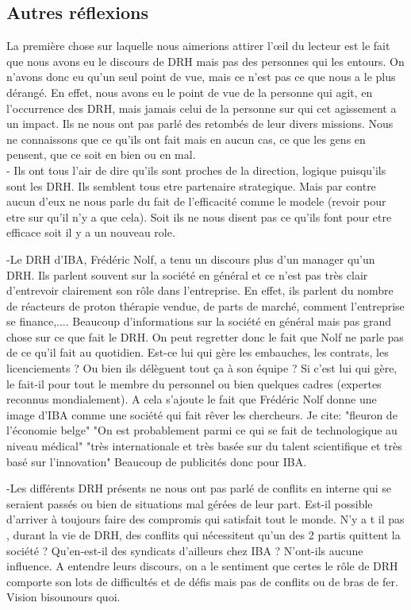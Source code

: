 \subsection{Autres réflexions}

La première chose sur laquelle nous aimerions attirer l'œil du lecteur est le fait que nous avons eu le discours de DRH mais pas des personnes qui les entours. On n'avons donc eu qu'un seul point de vue, mais ce n'est pas ce que nous a le plus dérangé. En effet, nous avons eu le point de vue de la personne qui agit, en l'occurrence des DRH, mais jamais celui de la personne sur qui cet agissement a un impact. Ils ne nous ont pas parlé des retombés de leur divers missions. Nous ne connaissons que ce qu'ils ont fait mais en aucun cas, ce que les gens en pensent, que ce soit en bien ou en mal. \\ 



- Ils ont tous l'air de dire qu'ils sont proches de la direction, logique puisqu'ils sont les DRH. Ils semblent tous etre partenaire strategique. Mais par contre aucun d'eux ne nous parle du fait de l'efficacité comme le modele (revoir pour etre sur qu'il n'y a que cela). Soit ils ne nous disent pas ce qu'ils font pour etre efficace soit il y a un nouveau role. 


-Le DRH d'IBA, Frédéric Nolf, a tenu un discours plus d'un manager qu'un DRH. Ils parlent souvent sur la société en général et ce n'est pas très clair d'entrevoir clairement son rôle dans l'entreprise. En effet, ils parlent du nombre de réacteurs de proton thérapie vendue, de parts de marché, comment l'entreprise se finance,.... Beaucoup d'informations sur la société en général mais pas grand chose sur ce que fait le DRH. On peut regretter donc le fait que Nolf ne parle pas de ce qu'il fait au quotidien. Est-ce lui qui gère les embauches, les contrats, les licenciements ? Ou bien ils délèguent tout ça à son équipe ? Si c'est lui qui gère, le fait-il pour tout le membre du personnel ou bien quelques cadres (expertes reconnus mondialement). 
 A cela s'ajoute le fait que Frédéric Nolf donne une image d'IBA comme une société qui fait rêver les chercheurs.
 Je cite:
 "fleuron de l'économie belge"
 "On est probablement parmi ce qui se fait de technologique au niveau médical"
 "très internationale  et très basée sur du talent scientifique et très basé sur l'innovation"
 Beaucoup de publicités donc pour IBA.
 
 
 
-Les différents DRH présents ne nous ont pas parlé de conflits en interne qui se seraient passés ou bien de situations mal gérées de leur part. Est-il possible d'arriver à toujours faire des compromis qui satisfait tout le monde. N'y a t il pas , durant la vie de DRH, des conflits qui nécessitent qu'un des 2 partis quittent la société ? Qu'en-est-il des syndicats d'ailleurs chez IBA ? N'ont-ils aucune influence. A entendre leurs discours, on a le sentiment que certes le rôle de DRH comporte son lots de difficultés et de défis mais pas de conflits ou de bras de fer. Vision bisounours quoi.
